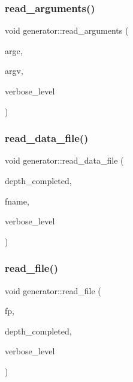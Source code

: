 \subsubsection{\texorpdfstring{read\+\_\+arguments()}{read\_arguments()}}
{\footnotesize\ttfamily void generator\+::read\+\_\+arguments (\begin{DoxyParamCaption}\item[{int}]{argc,  }\item[{const char $\ast$$\ast$}]{argv,  }\item[{\mbox{\hyperlink{galois_8h_a09fddde158a3a20bd2dcadb609de11dc}{I\+NT}}}]{verbose\+\_\+level }\end{DoxyParamCaption})}

\mbox{\label{classgenerator_a6109d5e04d03f3cb8263ddfa1d8f78b2}} 
\subsubsection{\texorpdfstring{read\+\_\+data\+\_\+file()}{read\_data\_file()}}
{\footnotesize\ttfamily void generator\+::read\+\_\+data\+\_\+file (\begin{DoxyParamCaption}\item[{\mbox{\hyperlink{galois_8h_a09fddde158a3a20bd2dcadb609de11dc}{I\+NT}} \&}]{depth\+\_\+completed,  }\item[{const \mbox{\hyperlink{galois_8h_ab6cc7b4aeb6ea31aba2b3fbfc83ff5e6}{B\+Y\+TE}} $\ast$}]{fname,  }\item[{\mbox{\hyperlink{galois_8h_a09fddde158a3a20bd2dcadb609de11dc}{I\+NT}}}]{verbose\+\_\+level }\end{DoxyParamCaption})}

\mbox{\label{classgenerator_a3d3a847e7b24d799ded67d7db5e6b22d}} 
\subsubsection{\texorpdfstring{read\+\_\+file()}{read\_file()}}
{\footnotesize\ttfamily void generator\+::read\+\_\+file (\begin{DoxyParamCaption}\item[{ifstream \&}]{fp,  }\item[{\mbox{\hyperlink{galois_8h_a09fddde158a3a20bd2dcadb609de11dc}{I\+NT}} \&}]{depth\+\_\+completed,  }\item[{\mbox{\hyperlink{galois_8h_a09fddde158a3a20bd2dcadb609de11dc}{I\+NT}}}]{verbose\+\_\+level }\end{DoxyParamCaption})}

